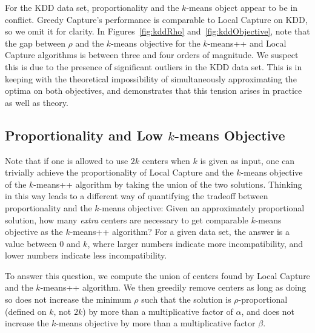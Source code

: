 For the KDD data set, proportionality and the $k$-means object appear to be in conflict. Greedy Capture's performance is comparable to Local Capture on KDD, so we omit it for clarity. In Figures~\ref{fig:kddRho} and~\ref{fig:kddObjective}, note that the gap between $\rho$ and the $k$-means objective for the $k$-means++ and Local Capture algorithms is between three and four orders of magnitude. We suspect this is due to the presence of significant outliers in the KDD data set. This is in keeping with the theoretical impossibility of simultaneously approximating the optima on both objectives, and demonstrates that this tension arises in practice as well as theory.



\subsection{Proportionality and Low $k$-means Objective}
Note that if one is allowed to use $2k$ centers when $k$ is given as input, one can trivially achieve the proportionality of Local Capture and the $k$-means objective of the $k$-means++ algorithm by taking the union of the two solutions. Thinking in this way leads to a different way of quantifying the tradeoff between proportionality and the $k$-means objective: Given an approximately proportional solution, how many \textit{extra} centers are necessary to get comparable $k$-means objective as the $k$-means++ algorithm? For a given data set, the answer is a value between 0 and $k$, where larger numbers indicate more incompatibility, and lower numbers indicate less incompatibility.  

To answer this question, we compute the union of centers found by Local Capture and the $k$-means++ algorithm. We then greedily remove centers as long as doing so does not increase the minimum $\rho$ such that the solution is $\rho$-proportional (defined on $k$, not $2k$) by more than a multiplicative factor of $\alpha$, and does not increase the $k$-means objective by more than a multiplicative factor $\beta$.  

